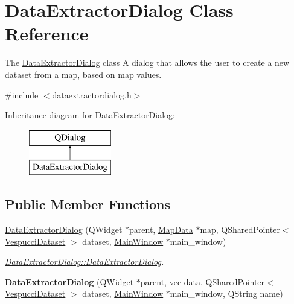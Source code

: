 \hypertarget{class_data_extractor_dialog}{}\section{Data\+Extractor\+Dialog Class Reference}
\label{class_data_extractor_dialog}


The \hyperlink{class_data_extractor_dialog}{Data\+Extractor\+Dialog} class A dialog that allows the user to create a new dataset from a map, based on map values.  




{\ttfamily \#include $<$dataextractordialog.\+h$>$}

Inheritance diagram for Data\+Extractor\+Dialog\+:\begin{figure}[H]
\begin{center}
\leavevmode
\includegraphics[height=2.000000cm]{class_data_extractor_dialog}
\end{center}
\end{figure}
\subsection*{Public Member Functions}
\begin{DoxyCompactItemize}
\item 
\hyperlink{class_data_extractor_dialog_a1f258b0b0a524e2a2b574fe170ed7fdb}{Data\+Extractor\+Dialog} (Q\+Widget $\ast$parent, \hyperlink{class_map_data}{Map\+Data} $\ast$map, Q\+Shared\+Pointer$<$ \hyperlink{class_vespucci_dataset}{Vespucci\+Dataset} $>$ dataset, \hyperlink{class_main_window}{Main\+Window} $\ast$main\+\_\+window)
\begin{DoxyCompactList}\small\item\em \hyperlink{class_data_extractor_dialog_a1f258b0b0a524e2a2b574fe170ed7fdb}{Data\+Extractor\+Dialog\+::\+Data\+Extractor\+Dialog}. \end{DoxyCompactList}\item 
{\bfseries Data\+Extractor\+Dialog} (Q\+Widget $\ast$parent, vec data, Q\+Shared\+Pointer$<$ \hyperlink{class_vespucci_dataset}{Vespucci\+Dataset} $>$ dataset, \hyperlink{class_main_window}{Main\+Window} $\ast$main\+\_\+window, Q\+String name)\hypertarget{class_data_extractor_dialog_a535646a4cce7c7e2e3b45589f0ee54aa}{}\label{class_data_extractor_dialog_a535646a4cce7c7e2e3b45589f0ee54aa}

\end{DoxyCompactItemize}


